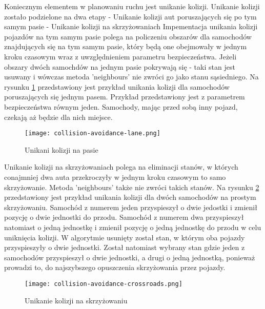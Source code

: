 Koniecznym elementem w planowaniu ruchu jest unikanie kolizji.
\newline
\newline
Unikanie kolizji zostało podzielone na dwa etapy
\newline
- Unikanie kolizji aut poruszających się po tym samym pasie
\newline
- Unikanie kolizji na skrzyżowaniach
\newline
\newline
Impementacja unikania kolizji pojazdów na tym samym pasie polega na policzeniu obszarów dla samochodów znajdujących się na tym samym pasie, który będą one obejmowały w jednym kroku czasowym wraz z uwzględnieniem parametru bezpieczeństwa.
\newline
\newline
Jeżeli obszary dwóch samochdów na jednym pasie pokrywają się - taki stan jest usuwany i wówczas metoda 'neighbours' nie zwróci go jako stanu sąsiedniego.
\newline
\newline
Na rysunku \ref{collision-avoidance-lane} przedstawiony jest przykład unikania kolizji dla samochodów poruszających się jednym pasem. Przykład przedstawiony jest z parametrem bezpieczeństwa równym jeden. Samochody, mając przed sobą inny pojazd, czekają aż będzie dla nich miejsce.
\begin{figure}
    \texttt{[image: collision-avoidance-lane.png]}
  \caption{Unikani kolizji na pasie}
  \label{collision-avoidance-lane}
\end{figure}
\newpage
Unikanie kolizji na skrzyżowaniach polega na eliminacji stanów, w których conajmniej dwa auta przekroczyły w jednym kroku czasowym to samo skrzyżowanie. Metoda 'neighbours' także nie zwróci takich stanów.
\newline
\newline
Na rysunku \ref{collision-avoidance-crossroads} przedstawiony jest przykład unikania kolizji dla dwóch samochodów na prostym skrzyżowaniu. Samochód z numerem jeden przyspieszył o dwie jedostki i zmienił pozycję o dwie jednostki do przodu. Samochód z numerem dwa przyspieszył natomiast o jedną jednostkę i zmienił pozycję o jedną jednostkę do przodu w celu uniknięcia kolizji.
\newline
\newline
W algorytmie usunięty został stan, w którym oba pojazdy przyspieszyły o dwie jednostki. Został natomiast wybrany stan gdzie jeden z samochodów przyspieszył o dwie jednostki, a drugi o jedną jednostką, ponieważ prowadzi to, do najszybszego opuszczenia skrzyżowania przez pojazdy.
\begin{figure}
    \texttt{[image: collision-avoidance-crossroads.png]}
  \caption{Unikanie kolizji na skrzyżowaniu}
  \label{collision-avoidance-crossroads}
\end{figure}
\newpage

